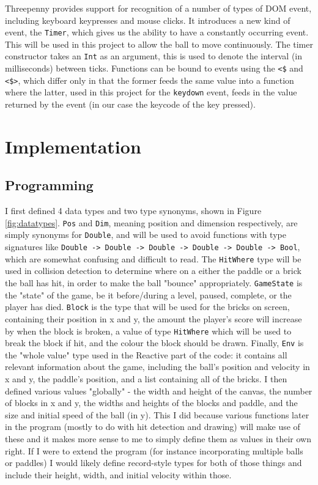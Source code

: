 \documentclass[12pt]{article}
\begin{document}
\par

Threepenny provides support for recognition of a number of types of DOM event, including keyboard keypresses and mouse clicks.
It introduces a new kind of event, the \verb|Timer|, which gives us the ability to have a constantly occurring event.
This will be used in this project to allow the ball to move continuously.
The timer constructor takes an \verb|Int| as an argument, this is used to denote the interval (in milliseconds) between ticks.
Functions can be bound to events using the \verb|<$| and \verb|<$>|, which differ only in that the former feeds the same value into a function where the latter, used in this project for the \verb|keydown| event, feeds in the value returned by the event (in our case the keycode of the key pressed).

\section{Implementation}

\subsection{Programming}

I first defined 4 data types and two type synonyms, shown in Figure \ref{fig:datatypes}.
\verb|Pos| and \verb|Dim|, meaning position and dimension respectively, are simply synonyms for \verb|Double|, and will be used to avoid functions with type signatures like \verb|Double -> Double -> Double -> Double -> Double -> Bool|, which are somewhat confusing and difficult to read.
The \verb|HitWhere| type will be used in collision detection to determine where on a either the paddle or a brick the ball has hit, in order to make the ball "bounce" appropriately.
\verb|GameState| is the "state" of the game, be it before/during a level, paused, complete, or the player has died.
\verb|Block| is the type that will be used for the bricks on screen, containing their position in x and y, the amount the player's score will increase by when the block is broken, a value of type \verb|HitWhere| which will be used to break the block if hit, and the colour the block should be drawn.
Finally, \verb|Env| is the "whole value" type used in the Reactive part of the code: it contains all relevant information about the game, including the ball's position and velocity in x and y, the paddle's position, and a list containing all of the bricks.
I then defined various values "globally" - the width and height of the canvas, the number of blocks in x and y, the widths and heights of the blocks and paddle, and the size and initial speed of the ball (in y).
This I did because various functions later in the program (mostly to do with hit detection and drawing) will make use of these and it makes more sense to me to simply define them as values in their own right.
If I were to extend the program (for instance incorporating multiple balls or paddles) I would likely define record-style types for both of those things and include their height, width, and initial velocity within those.
\end{document}
